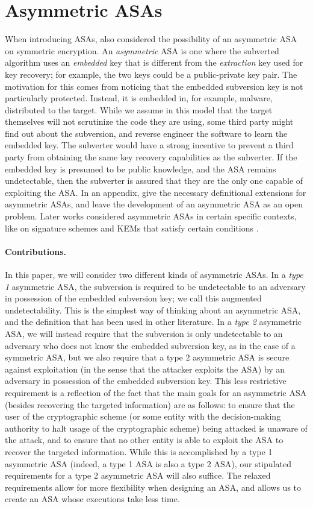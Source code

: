 \section{Asymmetric ASAs}
When introducing ASAs, \cite{C:BelPatRog14} also considered the possibility of an asymmetric ASA on symmetric encryption. An \emph{asymmetric} ASA is one where the subverted algorithm uses an \emph{embedded} key that is different from the \emph{extraction} key used for key recovery; for example, the two keys could be a public-private key pair. The motivation for this comes from noticing that the embedded subversion key is not particularly protected. Instead, it is embedded in, for example, malware, distributed to the target. While we assume in this model that the target themselves will not scrutinize the code they are using, some third party might find out about the subversion, and reverse engineer the software to learn the embedded key. The subverter would have a strong incentive to prevent a third party from obtaining the same key recovery capabilities as the subverter. If the embedded key is presumed to be public knowledge, and the ASA remains undetectable, then the subverter is assured that they are the only one capable of exploiting the ASA. In an appendix, \cite{C:BelPatRog14} give the necessary definitional extensions for asymmetric ASAs, and leave the development of an asymmetric ASA as an open problem. Later works considered asymmetric ASAs in certain specific contexts, like on signature schemes and KEMs that satisfy certain conditions \cite{AC:CheHuaYun20,BSKC2019}.

\paragraph{Contributions.}
In this paper, we will consider two different kinds of asymmetric ASAs. In a \emph{type 1} asymmetric ASA, the subversion is required to be undetectable to an adversary in possession of the embedded subversion key; we call this augmented undetectability. This is the simplest way of thinking about an asymmetric ASA, and the definition that has been used in other literature. In a \emph{type 2} asymmetric ASA, we will instead require that the subversion is only undetectable to an adversary who does not know the embedded subversion key, as in the case of a symmetric ASA, but we also require that a type 2 asymmetric ASA is secure against exploitation (in the sense that the attacker exploits the ASA) by an adversary in possession of the embedded subversion key. This less restrictive requirement is a reflection of the fact that the main goals for an asymmetric ASA (besides recovering the targeted information) are as follows: to ensure that the user of the cryptographic scheme (or some entity with the decision-making authority to halt usage of the cryptographic scheme) being attacked is unaware of the attack, and to ensure that no other entity is able to exploit the ASA to recover the targeted information. While this is accomplished by a type 1 asymmetric ASA (indeed, a type 1 ASA is also a type 2 ASA), our stipulated requirements for a type 2 asymmetric ASA will also suffice. The relaxed requirements allow for more flexibility when designing an ASA, and allows us to create an ASA whose executions take less time.

